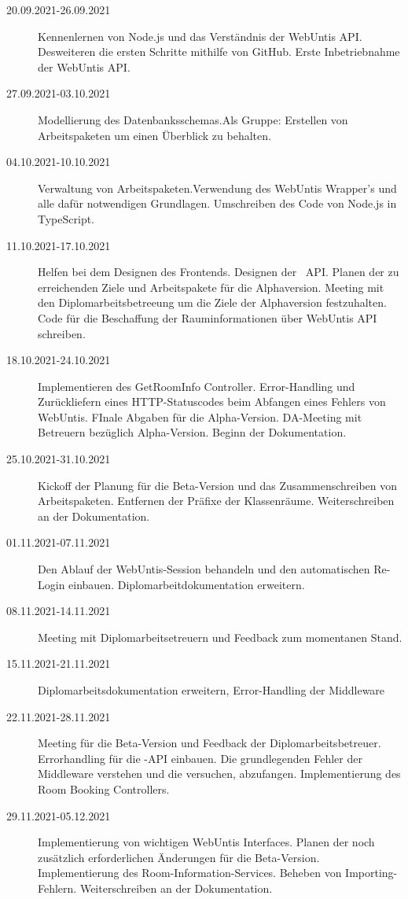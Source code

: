 
\begin{description}
    \item[20.09.2021-26.09.2021] Kennenlernen von Node.js und das Verständnis der WebUntis API. Desweiteren die ersten Schritte mithilfe von GitHub. Erste Inbetriebnahme der WebUntis API. 
    \item[27.09.2021-03.10.2021] Modellierung des Datenbanksschemas.Als Gruppe: Erstellen von Arbeitspaketen um einen Überblick zu behalten.
    \item[04.10.2021-10.10.2021] Verwaltung von Arbeitspaketen.Verwendung des WebUntis Wrapper's und alle dafür notwendigen Grundlagen. Umschreiben des Code von Node.js in TypeScript.
    \item[11.10.2021-17.10.2021] Helfen bei dem Designen des Frontends. Designen der \ZELIA\ API. Planen der zu erreichenden Ziele und Arbeitspakete für die Alphaversion. Meeting mit den Diplomarbeitsbetreeung um die Ziele der Alphaversion festzuhalten. Code für die Beschaffung der Rauminformationen über WebUntis API schreiben. 
    \item[18.10.2021-24.10.2021] Implementieren des GetRoomInfo Controller. Error-Handling und Zurückliefern eines HTTP-Statuscodes beim Abfangen eines Fehlers von WebUntis. FInale Abgaben für die Alpha-Version. DA-Meeting mit Betreuern bezüglich Alpha-Version. Beginn der Dokumentation.
    \item[25.10.2021-31.10.2021] Kickoff der Planung für die Beta-Version und das Zusammenschreiben von Arbeitspaketen. Entfernen der Präfixe der Klassenräume. Weiterschreiben an der Dokumentation.
    \item[01.11.2021-07.11.2021] Den Ablauf der WebUntis-Session behandeln und den automatischen Re-Login einbauen. Diplomarbeitdokumentation erweitern. 
    \item[08.11.2021-14.11.2021] Meeting mit Diplomarbeitsetreuern und Feedback zum momentanen Stand.
    \item[15.11.2021-21.11.2021] Diplomarbeitsdokumentation erweitern, Error-Handling der Middleware
    \item[22.11.2021-28.11.2021] Meeting für die Beta-Version und Feedback der Diplomarbeitsbetreuer. Errorhandling für die \ZELIA-API einbauen. Die grundlegenden Fehler der Middleware verstehen und die versuchen, abzufangen. Implementierung des Room Booking Controllers. 
    \item[29.11.2021-05.12.2021] Implementierung von wichtigen WebUntis Interfaces. Planen der noch zusätzlich erforderlichen Änderungen für die Beta-Version. Implementierung des Room-Information-Services. Beheben von Importing-Fehlern. Weiterschreiben an der Dokumentation.

\end{description}
